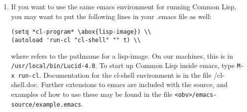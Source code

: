\begin{enumerate}
\item 
If you want to use the same emacs environment for running Common Lisp,
you may want to put the following lines in your .emacs file as well:
\begin{verbatim}
(setq *cl-program* \abox{lisp-image}) \\
(autoload 'run-cl "cl-shell" "" t) \\
\end{verbatim}
where  refers to the pathname for a lisp-image.  On
our machines, this is in {\tt /usr/local/bin/Lucid-4.0}.  To start up
Common Lisp inside emacs, type {\tt M-x run-cl}.  Documentation for
the cl-shell environment is in the file
/cl-shell.doc.  Further extensions to emacs are
included with the source, and examples of how to use these may be
found in the file {\tt <obv>/emacs-source/example.emacs}.

\end{enumerate}

